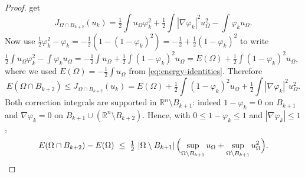 \documentclass[11pt]{amsart}
\theoremstyle{definition}
\newcommand{\R}{\mathbb R}
\newcommand{\Om}{\Omega}
\newcommand{\abs}[1]{\left|#1\right|}
\begin{document}
\begin{proof}
get
\[
   J_{\Om\cap B_{k+2}}(u_k)
   =\tfrac12\!\int u_\Om\varphi_k^2
   +\tfrac12\!\int\abs{\nabla\varphi_k}^2u_\Om^2
   -\int\varphi_k u_\Om .
\]
Now use $\tfrac12\varphi_k^2-\varphi_k=-\tfrac12(1-(1-\varphi_k)^2)
=-\tfrac12+\tfrac12(1-\varphi_k)^2$ to write
$\tfrac12\int u_\Om\varphi_k^2-\int\varphi_k u_\Om
=-\tfrac12\int u_\Om+\tfrac12\int(1-\varphi_k)^2u_\Om
=E(\Om)+\tfrac12\int(1-\varphi_k)^2u_\Om$, where we used
$E(\Om)=-\tfrac12\int u_\Om$ from \eqref{eq:energy-identities}.
Therefore
\begin{equation}\label{eq:energy-exact}
   E(\Om\cap B_{k+2})\le J_{\Om\cap B_{k+2}}(u_k)
   =E(\Om)+\tfrac12\int(1-\varphi_k)^2u_\Om
          +\tfrac12\int\abs{\nabla\varphi_k}^2u_\Om^2 .
\end{equation}
Both correction integrals are supported in $\R^n\setminus B_{k+1}$:
indeed $1-\varphi_k=0$ on $B_{k+1}$ and $\nabla\varphi_k=0$ on
$B_{k+1}\cup(\R^n\setminus B_{k+2})$. Hence, with $0\le1-\varphi_k\le1$
and $\abs{\nabla\varphi_k}\le1$,
\begin{equation}\label{eq:energy-comp-pre}
   E(\Om\cap B_{k+2})-E(\Om)
   \;\le\;\tfrac12\,\abs{\Om\setminus B_{k+1}}
   \Bigl(\sup_{\Om\setminus B_{k+1}}u_\Om
        +\sup_{\Om\setminus B_{k+1}}u_\Om^2\Bigr).
\end{equation}

\end{proof}
\end{document}
